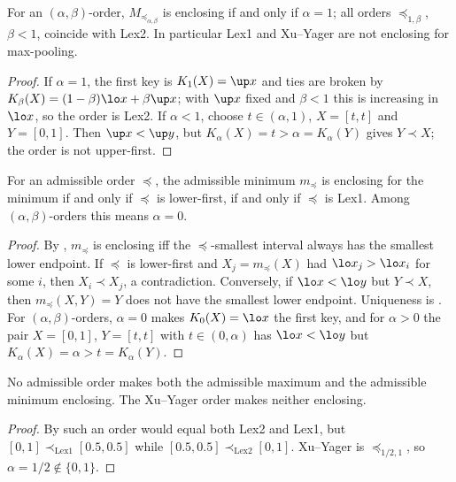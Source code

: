 \begin{corollary}\label{cor:ab}
For an $(\alpha,\beta)$-order, $M_{\preceq_{\alpha,\beta}}$ is enclosing if and only if $\alpha=1$; all orders $\preceq_{1,\beta}$, $\beta<1$, coincide with Lex2. In particular Lex1 and Xu--Yager are not enclosing for max-pooling.
\end{corollary}

\begin{proof}
If $\alpha=1$, the first key is $K_1(X)=\up x$ and ties are broken by $K_\beta(X)=(1-\beta)\lo x+\beta\up x$; with $\up x$ fixed and $\beta<1$ this is increasing in $\lo x$, so the order is Lex2. If $\alpha<1$, choose $t\in(\alpha,1)$, $X=[t,t]$ and $Y=[0,1]$. Then $\up x<\up y$, but $K_\alpha(X)=t>\alpha=K_\alpha(Y)$ gives $Y\prec X$; the order is not upper-first.
\end{proof}

\begin{theorem}\label{thm:min}
For an admissible order $\preceq$, the admissible minimum $m_\preceq$ is enclosing for the minimum if and only if $\preceq$ is lower-first, if and only if $\preceq$ is Lex1. Among $(\alpha,\beta)$-orders this means $\alpha=0$.
\end{theorem}

\begin{proof}
By , $m_\preceq$ is enclosing iff the $\preceq$-smallest interval always has the smallest lower endpoint. If $\preceq$ is lower-first and $X_j=m_\preceq(X)$ had $\lo x_j>\lo x_i$ for some $i$, then $X_i\prec X_j$, a contradiction. Conversely, if $\lo x<\lo y$ but $Y\prec X$, then $m_\preceq(X,Y)=Y$ does not have the smallest lower endpoint. Uniqueness is . For $(\alpha,\beta)$-orders, $\alpha=0$ makes $K_0(X)=\lo x$ the first key, and for $\alpha>0$ the pair $X=[0,1]$, $Y=[t,t]$ with $t\in(0,\alpha)$ has $\lo x<\lo y$ but $K_\alpha(X)=\alpha>t=K_\alpha(Y)$.
\end{proof}

\begin{corollary}[Impossibility]\label{cor:impossible}
No admissible order makes both the admissible maximum and the admissible minimum enclosing. The Xu--Yager order makes neither enclosing.
\end{corollary}

\begin{proof}
By  such an order would equal both Lex2 and Lex1, but $[0,1]\prec_{\mathrm{Lex1}}[0.5,0.5]$ while $[0.5,0.5]\prec_{\mathrm{Lex2}}[0,1]$. Xu--Yager is $\preceq_{1/2,1}$, so $\alpha=1/2\notin\{0,1\}$.
\end{proof}

